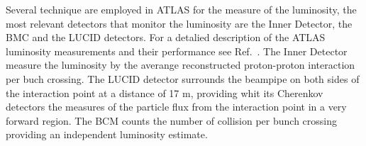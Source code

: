 Several technique are employed in ATLAS for the measure of the luminosity, the most relevant detectors that  monitor the 
luminosity are the Inner Detector, the BMC and the LUCID detectors. For a detalied description of the ATLAS luminosity measurements
and their performance see Ref.~\cite{luminosity}.
The Inner Detector measure the luminosity by the averange reconstructed proton-proton interaction per buch crossing.
The LUCID detector surrounds the beampipe on both sides of the interaction point at a distance of 17 m, providing whit its Cherenkov
detectors the measures of the particle flux from the interaction point in a very forward region. The BCM counts the number of collision per 
bunch crossing providing an independent luminosity estimate.











